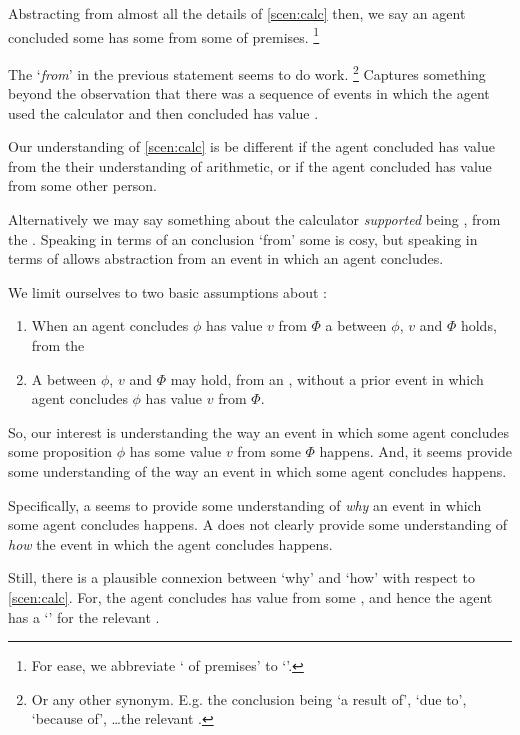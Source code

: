 \begin{note}
  Abstracting from almost all the details of \autoref{scen:calc} then, we say an agent concluded some \prop{} has some \val{} from some \pool{} of premises.%
  \footnote{
    For ease, we abbreviate `\pool{} of premises' to `\pool{}'.
  }

  The `\emph{from}' in the previous statement seems to do work.%
  \footnote{
    Or any other synonym.
    E.g. the conclusion being `a result of', `due to', `because of', \dots the relevant \pool{}.
  }
  Captures something beyond the observation that there was a sequence of events in which the agent used the calculator and then concluded \propM{\gistCalcEq{}} has value .

  Our understanding of \autoref{scen:calc} is be different if the agent concluded \propM{\gistCalcEq{}} has value  from the their understanding of arithmetic, or if the agent concluded \propM{\gistCalcEq{}} has value  from some other person.

  Alternatively we may say something about the calculator \emph{supported} \propM{\gistCalcEq{}} being , from the \agpe{}.
  Speaking in terms of an \agents{} conclusion `from' some \pool{} is cosy, but speaking in terms of \ros{}  allows abstraction from an event in which an agent concludes.

  We limit ourselves to two basic assumptions about :
  \begin{enumerate}
  \item
    When an agent concludes \(\phi\) has value \(v\) from \(\Phi\) a \ros{} between \(\phi\), \(v\) and \(\Phi\) holds, from the \agpe{}
  \item
    A \ros{} between \(\phi\), \(v\) and \(\Phi\) may hold, from an \agpe{}, without a prior event in which agent concludes \(\phi\) has value \(v\) from \(\Phi\).
  \end{enumerate}
\end{note}

\begin{note}
  So, our interest is understanding the way an event in which some agent concludes some proposition \(\phi\) has some value \(v\) from some \pool{} \(\Phi\) happens.
  And, it seems  provide some understanding of the way an event in which some agent concludes happens.

  Specifically, a \ros{} seems to provide some understanding of \emph{why} an event in which some agent concludes happens.
  A \ros{} does not clearly provide some understanding of \emph{how} the event in which the agent concludes happens.

  Still, there is a plausible connexion between `why' and `how' with respect to \autoref{scen:calc}.
  For, the agent concludes \propM{\gistCalcEq{}} has value  from some \pool{}, and hence the agent has a `\wit{}' for the relevant \ros{}.
\end{note}

